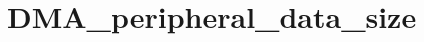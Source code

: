 \hypertarget{group___d_m_a__peripheral__data__size}{\section{D\-M\-A\-\_\-peripheral\-\_\-data\-\_\-size}
\label{group___d_m_a__peripheral__data__size}
}

